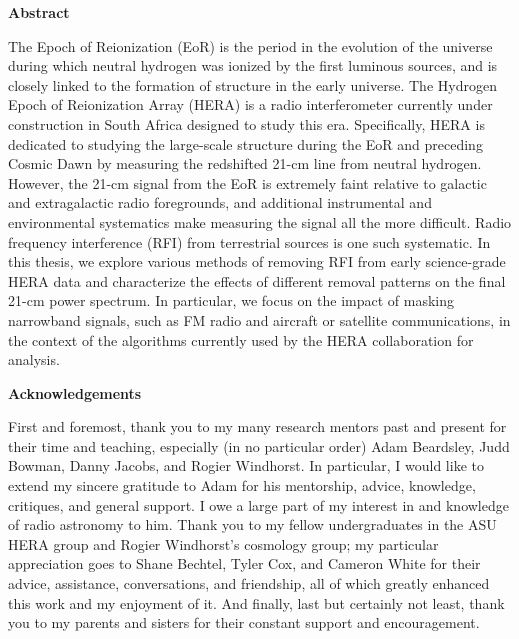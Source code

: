 \documentclass[12pt]{article}
\begin{document}
\clearpage
{}

\begin{center}
	\textbf{Abstract}
\end{center}

The Epoch of Reionization (EoR) is the period in the evolution of the universe during which neutral hydrogen was ionized by the first luminous sources, and is closely linked to the formation of structure in the early universe. The Hydrogen Epoch of Reionization Array (HERA) is a radio interferometer currently under construction in South Africa designed to study this era. Specifically, HERA is dedicated to studying the large-scale structure during the EoR and preceding Cosmic Dawn by measuring the redshifted 21-cm line from neutral hydrogen. However, the 21-cm signal from the EoR is extremely faint relative to galactic and extragalactic radio foregrounds, and additional instrumental and environmental systematics make measuring the signal all the more difficult. Radio frequency interference (RFI) from terrestrial sources is one such systematic. In this thesis, we explore various methods of removing RFI from early science-grade HERA data and characterize the effects of different removal patterns on the final 21-cm power spectrum. In particular, we focus on the impact of masking narrowband signals, such as FM radio and aircraft or satellite communications, in the context of the algorithms currently used by the HERA collaboration for analysis. 

\newpage
\begingroup
\hypersetup{
	citecolor=DarkBlue,
	filecolor=black,
	linkcolor=black,
	urlcolor=DarkBlue
}
\renewcommand{\thesection}{\Roman{section}}
\tableofcontents
\listoffigures
\endgroup

\newpage
\begin{center}
	\textbf{Acknowledgements}
\end{center}

First and foremost, thank you to my many research mentors past and present for their time and teaching, especially (in no particular order) Adam Beardsley, Judd Bowman, Danny Jacobs, and Rogier Windhorst. In particular, I would like to extend my sincere gratitude to Adam for his mentorship, advice, knowledge, critiques, and general support. I owe a large part of my interest in and knowledge of radio astronomy to him. Thank you to my fellow undergraduates in the ASU HERA group and Rogier Windhorst's cosmology group; my particular appreciation goes to Shane Bechtel, Tyler Cox, and Cameron White for their advice, assistance, conversations, and friendship, all of which greatly enhanced this work and my enjoyment of it. And finally, last but certainly not least, thank you to my parents and sisters for their constant support and encouragement.
\end{document}
